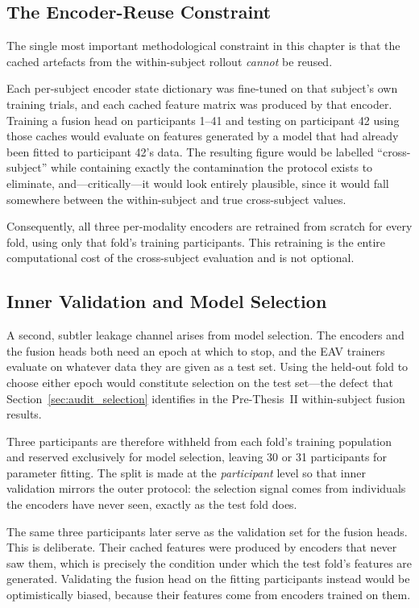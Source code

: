 \subsection{The Encoder-Reuse Constraint}
\label{sec:cs_leakage}

The single most important methodological constraint in this chapter is that the
cached artefacts from the within-subject rollout \emph{cannot} be reused.

Each per-subject encoder state dictionary was fine-tuned on that subject's own
training trials, and each cached feature matrix was produced by that encoder.
Training a fusion head on participants 1--41 and testing on participant 42 using
those caches would evaluate on features generated by a model that had already been
fitted to participant 42's data. The resulting figure would be labelled
``cross-subject'' while containing exactly the contamination the protocol exists to
eliminate, and---critically---it would look entirely plausible, since it would fall
somewhere between the within-subject and true cross-subject values.

Consequently, all three per-modality encoders are retrained from scratch for every
fold, using only that fold's training participants. This retraining is the entire
computational cost of the cross-subject evaluation and is not optional.

\subsection{Inner Validation and Model Selection}
\label{sec:cs_innerval}

A second, subtler leakage channel arises from model selection. The encoders and the
fusion heads both need an epoch at which to stop, and the EAV trainers evaluate on
whatever data they are given as a test set. Using the held-out fold to choose either
epoch would constitute selection on the test set---the defect that
Section~\ref{sec:audit_selection} identifies in the Pre-Thesis~II within-subject
fusion results.

Three participants are therefore withheld from each fold's training population and
reserved exclusively for model selection, leaving 30 or 31 participants for parameter
fitting. The split is made at the \emph{participant} level so that inner validation
mirrors the outer protocol: the selection signal comes from individuals the encoders
have never seen, exactly as the test fold does.

The same three participants later serve as the validation set for the fusion heads.
This is deliberate. Their cached features were produced by encoders that never saw
them, which is precisely the condition under which the test fold's features are
generated. Validating the fusion head on the fitting participants instead would be
optimistically biased, because their features come from encoders trained on them.

